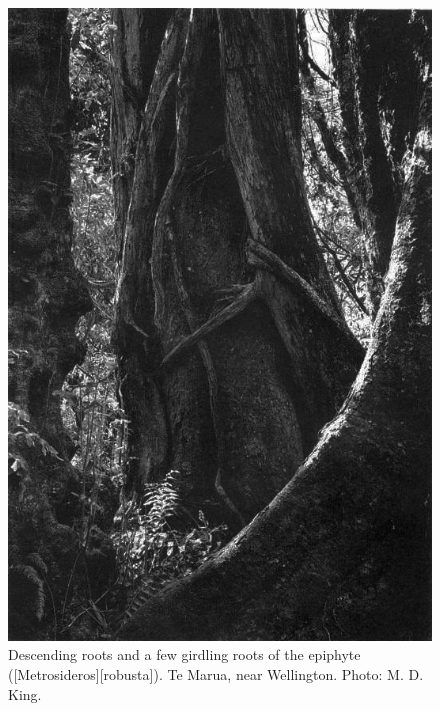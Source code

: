 \begin{figure}[!b]
	\begin{minipage}[t]{\textwidth}
		\begin{minipage}[t]{(\textwidth-\fgap) * \real{0.54}}
			\centering
			\includegraphics[width=\textwidth]{graphics/fig_050}
			\caption[Descending roots and a few girdling roots of the epiphyte northern rata]{Descending roots and a few girdling roots of the epiphyte  ([Metrosideros][robusta]).
			Te Marua, near Wellington.
			Photo: M. D. King.}%
			\label{fig:50rata}
		\end{minipage}\hspace{\fgap}%
		\begin{minipage}[t]{(\textwidth-\fgap) * \real{0.46}}

\end{minipage}
\end{minipage}
\end{figure}
